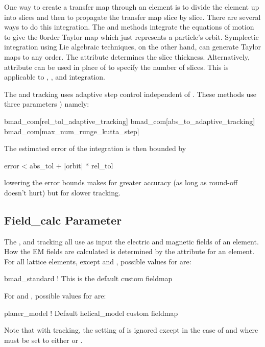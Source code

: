 One way to create a transfer map through an element is to divide the
element up into slices and then to propagate the transfer map slice by
slice.  There are several ways to do this integration. The 
and  methods integrate the equations of motion to
give the 0\Th order Taylor map which just represents a particle's
orbit.  Symplectic integration using Lie
algebraic techniques, on the other hand, can generate Taylor maps to
any order.  The  attribute determines the slice thickness.
Alternatively,  attribute can be used in place of
 to specify the number of slices.
This is applicable to , , and
 integration.

The  and  tracking uses adaptive step
control independent of . These methods use three  parameters
) namely:
\begin{example}
  bmad_com[rel_tol_adaptive_tracking]
  bmad_com[abs_to_adaptive_tracking]
  bmad_com[max_num_runge_kutta_step]
\end{example}
The estimated error of the integration is then bounded by
\begin{example}
  error < abs_tol + |orbit| * rel_tol
\end{example}
lowering the error bounds makes for greater accuracy (as long as round-off 
doesn't hurt) but for slower tracking. 

\subsection{Field_calc Parameter}
\label{s:field.calc}

The , and  tracking all use as input the electric and magnetic fields of
an element. How the EM fields are calculated is determined by the  attribute for an
element.  For all lattice elements, except  and , possible values for
 are:
\begin{example}
  bmad_standard     ! This is the default
  custom
  fieldmap
\end{example}
For  and , possible values for
 are:
\begin{example}
  planer_model   ! Default
  helical_model
  custom
  fieldmap
\end{example}
Note that with  tracking, the setting of  is ignored except in the
case of  and  where  must be set to either
 or .

